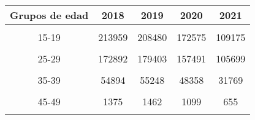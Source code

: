 \begin{tabular}[t]{ccccc}
\toprule
\textbf{Grupos de edad} & \textbf{2018} & \textbf{2019} & \textbf{2020} & \textbf{2021}\\
\midrule
\cellcolor[HTML]{B6B3FF}{10-14} & \cellcolor[HTML]{B6B3FF}{7506} & \cellcolor[HTML]{B6B3FF}{7659} & \cellcolor[HTML]{B6B3FF}{6856} & \cellcolor[HTML]{B6B3FF}{4703}\\
15-19 & 213959 & 208480 & 172575 & 109175\\
\cellcolor[HTML]{B6B3FF}{20-24} & \cellcolor[HTML]{B6B3FF}{262659} & \cellcolor[HTML]{B6B3FF}{267762} & \cellcolor[HTML]{B6B3FF}{230079} & \cellcolor[HTML]{B6B3FF}{152072}\\
25-29 & 172892 & 179403 & 157491 & 105699\\
\cellcolor[HTML]{B6B3FF}{30-34} & \cellcolor[HTML]{B6B3FF}{103730} & \cellcolor[HTML]{B6B3FF}{106045} & \cellcolor[HTML]{B6B3FF}{92247} & \cellcolor[HTML]{B6B3FF}{62014}\\
35-39 & 54894 & 55248 & 48358 & 31769\\
\cellcolor[HTML]{B6B3FF}{40-44} & \cellcolor[HTML]{B6B3FF}{15872} & \cellcolor[HTML]{B6B3FF}{15848} & \cellcolor[HTML]{B6B3FF}{13716} & \cellcolor[HTML]{B6B3FF}{9198}\\
45-49 & 1375 & 1462 & 1099 & 655\\
\cellcolor[HTML]{B6B3FF}{50-54} & \cellcolor[HTML]{B6B3FF}{258} & \cellcolor[HTML]{B6B3FF}{263} & \cellcolor[HTML]{B6B3FF}{198} & \cellcolor[HTML]{B6B3FF}{132}\\
\bottomrule
\end{tabular}
